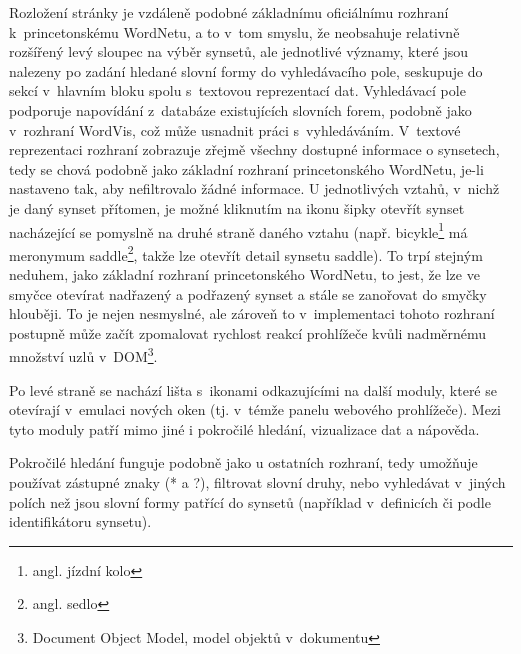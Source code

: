 \documentclass[a4paper,11pt,openany,twoside]{book}
\newcommand\ex{\textsf}
\begin{document}
					Rozložení stránky je vzdáleně podobné základnímu oficiálnímu rozhraní k~princetonskému WordNetu, a to v~tom smyslu, že neobsahuje relativně rozšířený levý sloupec na výběr synsetů, ale jednotlivé významy, které jsou nalezeny po zadání hledané slovní formy do vyhledávacího pole, seskupuje do sekcí v~hlavním bloku spolu s~textovou reprezentací dat. Vyhledávací pole podporuje napovídání z~databáze existujících slovních forem, podobně jako v~rozhraní WordVis, což může usnadnit práci s~vyhledáváním. V~textové reprezentaci rozhraní zobrazuje zřejmě všechny dostupné informace o synsetech, tedy se chová podobně jako základní rozhraní princetonského WordNetu, je-li nastaveno tak, aby nefiltrovalo žádné informace. U jednotlivých vztahů, v~nichž je daný synset přítomen, je možné kliknutím na ikonu šipky otevřít synset nacházející se pomyslně na druhé straně daného vztahu (např. \ex{bicykle}\footnote{angl. \ex{jízdní kolo}} má meronymum \ex{saddle}\footnote{angl. \ex{sedlo}}, takže lze otevřít detail synsetu \ex{saddle}). To trpí stejným neduhem, jako základní rozhraní princetonského WordNetu, to jest, že lze ve smyčce otevírat nadřazený a podřazený synset a stále se zanořovat do smyčky hlouběji. To je nejen nesmyslné, ale zároveň to v~implementaci tohoto rozhraní postupně může začít zpomalovat rychlost reakcí prohlížeče kvůli nadměrnému množství uzlů v~DOM\footnote{Document Object Model, model objektů v~dokumentu}.

					Po levé straně se nachází lišta s~ikonami odkazujícími na další moduly, které se otevírají v~emulaci nových oken (tj. v~témže panelu webového prohlížeče). Mezi tyto moduly patří mimo jiné i pokročilé hledání, vizualizace dat a nápověda. 

					Pokročilé hledání funguje podobně jako u ostatních rozhraní, tedy umožňuje používat zástupné znaky (\ex{*} a \ex{?}), filtrovat slovní druhy, nebo vyhledávat v~jiných polích než jsou slovní formy patřící do synsetů (například v~definicích či podle identifikátoru synsetu). 
\end{document}
